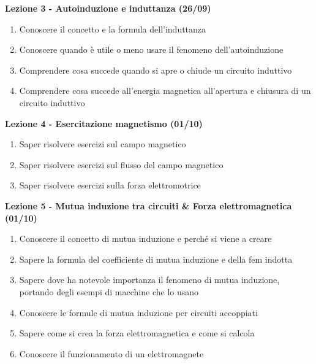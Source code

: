 \documentclass{article}
\begin{document}
	\begin{center}
		\textbf{Lezione 3 - Autoinduzione e induttanza (26/09)}
		\begin{enumerate}
			\item Conoscere il concetto e la formula dell'induttanza
			\item Conoscere quando è utile o meno usare il fenomeno dell'autoinduzione
			\item Comprendere cosa succede quando si apre o chiude un circuito induttivo
			\item Comprendere cosa succede all'energia magnetica all'apertura e chiusura di un circuito induttivo
		\end{enumerate}
	\end{center}

	\begin{center}
		\textbf{Lezione 4 - Esercitazione magnetismo (01/10)}
		\begin{enumerate}
			\item Saper risolvere esercizi sul campo magnetico
			\item Saper risolvere esercizi sul flusso del campo magnetico
			\item Saper risolvere esercizi sulla forza elettromotrice
		\end{enumerate}
	\end{center}

	\begin{center}
		\textbf{Lezione 5 - Mutua induzione tra circuiti \& Forza elettromagnetica (01/10)}
		\begin{enumerate}
			\item Conoscere il concetto di mutua induzione e perché si viene a creare
			\item Sapere la formula del coefficiente di mutua induzione e della fem indotta
			\item Sapere dove ha notevole importanza il fenomeno di mutua induzione, portando degli esempi di macchine che lo usano
			\item Conoscere le formule di mutua induzione per circuiti accoppiati
			\item Sapere come si crea la forza elettromagnetica e come si calcola
			\item Conoscere il funzionamento di un elettromagnete
		\end{enumerate}
	\end{center}
\end{document}
